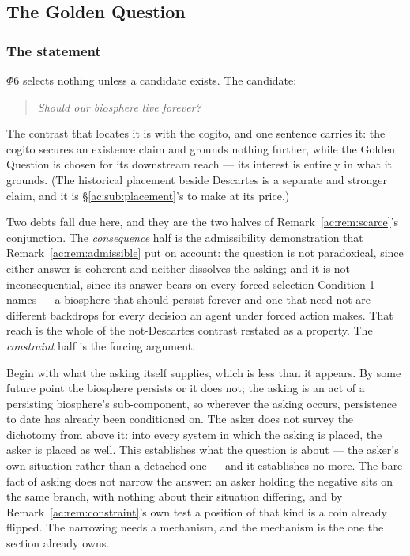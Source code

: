 \documentclass[11pt]{article}
\numberwithin{equation}{section}
\theoremstyle{plain}
\theoremstyle{definition}
\theoremstyle{remark}
\begin{document}
\subsection{The Golden Question}\label{ac:sub:question}

\subsubsection{The statement}\label{ac:ssub:statement}

$\Phi6$ selects nothing unless a candidate exists. The candidate:

\begin{quote}
    \emph{Should our biosphere live forever?}
\end{quote}

The contrast that locates it is with the cogito, and one sentence carries it: the cogito secures an existence claim and grounds nothing further, while the Golden Question is chosen for its downstream reach --- its interest is entirely in what it grounds. (The historical placement beside Descartes is a separate and stronger claim, and it is \S\ref{ac:sub:placement}'s to make at its price.)

Two debts fall due here, and they are the two halves of Remark~\ref{ac:rem:scarce}'s conjunction. The \emph{consequence} half is the admissibility demonstration that Remark~\ref{ac:rem:admissible} put on account: the question is not paradoxical, since either answer is coherent and neither dissolves the asking; and it is not inconsequential, since its answer bears on every forced selection Condition 1 names --- a biosphere that should persist forever and one that need not are different backdrops for every decision an agent under forced action makes. That reach is the whole of the not-Descartes contrast restated as a property. The \emph{constraint} half is the forcing argument.

Begin with what the asking itself supplies, which is less than it appears. By some future point the biosphere persists or it does not; the asking is an act of a persisting biosphere's sub-component, so wherever the asking occurs, persistence to date has already been conditioned on. The asker does not survey the dichotomy from above it: into every system in which the asking is placed, the asker is placed as well. This establishes what the question is about --- the asker's own situation rather than a detached one --- and it establishes no more. The bare fact of asking does not narrow the answer: an asker holding the negative sits on the same branch, with nothing about their situation differing, and by Remark~\ref{ac:rem:constraint}'s own test a position of that kind is a coin already flipped. The narrowing needs a mechanism, and the mechanism is the one the section already owns.
\end{document}
